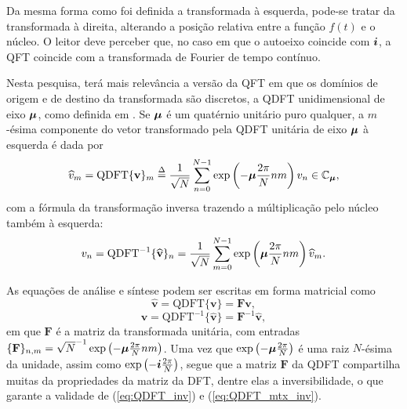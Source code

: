 Da mesma forma como foi definida a transformada \`a esquerda, pode-se tratar da transformada \`a direita, alterando a posi\c c\~ao relativa entre a fun\c c\~ao $ f(t) $ e o n\'ucleo. O leitor deve perceber que, no caso em que o autoeixo coincide com $ \boldsymbol{i} $, a QFT coincide com a transformada de Fourier de tempo
cont\'inuo.

Nesta pesquisa, ter\'a mais relev\^ancia a vers\~ao da QFT em que os dom\'inios de origem e de destino da transformada s\~ao discretos, a QDFT unidimensional de eixo $ \boldsymbol{\mu} $, como definida em \cite[sec. 3.3.1]{ell2014quaternion}. Se $ \boldsymbol{\mu} $ \'e um quat\'ernio unit\'ario puro qualquer, a $ m $-\'esima componente do vetor transformado pela QDFT unit\'aria de eixo $ \boldsymbol{\mu} $ \`a esquerda \'e dada por
\begin{equation}
\label{eq:QDFT_fwd}
\widehat{v}_m = \text{QDFT}\{ \mathbf{v} \}_m \overset{\Delta}{=} \frac{1}{\sqrt{N}} \sum_{n=0}^{N-1}  \exp \left( -\boldsymbol{\mu} \frac{2\pi}{N} nm \right) v_n \in \mathbb{C}_{\boldsymbol{\mu}},
\end{equation}
com a f\'ormula da transforma\c c\~ao inversa trazendo a m\'ultiplica\c c\~ao pelo n\'ucleo tamb\'em \`a esquerda:
\begin{equation}
\label{eq:QDFT_inv}
v_n = \text{QDFT}^{-1}\{ \widehat{\mathbf{v}} \}_n = \frac{1}{\sqrt{N}}\sum_{m=0}^{N-1}  \exp \left( \boldsymbol{\mu} \frac{2\pi}{N} nm \right) \widehat{v}_m.
\end{equation}

As equa\c c\~oes de an\'alise e s\'intese podem ser escritas em forma matricial como
\begin{equation}
\label{eq:QDFT}
\widehat{\mathbf{v}} = \text{QDFT}\{ \mathbf{v} \} = \mathbf{F} \mathbf{v},
\end{equation}
\begin{equation}
\label{eq:QDFT_mtx_inv}
\mathbf{v} = \text{QDFT}^{-1}\{ \widehat{\mathbf{v}} \} = \mathbf{F}^{-1} \widehat{\mathbf{v}},
\end{equation}
em que $ \mathbf{F} $ \'e a matriz da transformada unit\'aria,
com entradas $ \{\mathbf{F}\}_{n,m} = \sqrt{N}^{-1} \exp \left( -\boldsymbol{\mu} \frac{2\pi}{N} nm \right)$. Uma vez que  $ \exp \left( -\boldsymbol{\mu} \frac{2\pi}{N} \right) $ \'e uma raiz $ N $-\'esima da unidade, assim como $ \exp \left( -\boldsymbol{i} \frac{2\pi}{N} \right) $, segue que a matriz $ \mathbf{F} $ da QDFT compartilha muitas da propriedades da matriz da DFT, dentre elas a inversibilidade, o que garante a validade de (\ref{eq:QDFT_inv}) e  (\ref{eq:QDFT_mtx_inv}).

